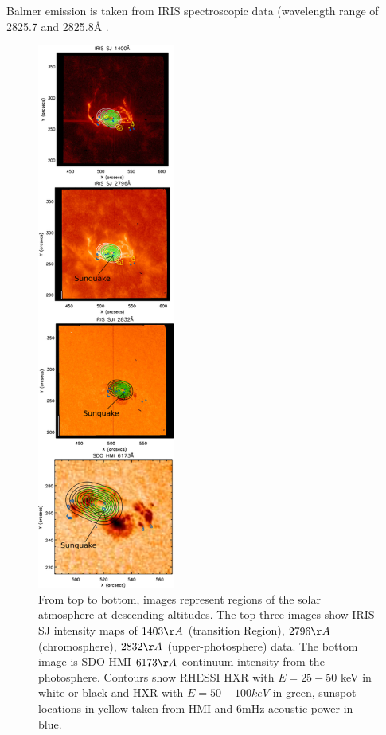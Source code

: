 Balmer emission is taken from IRIS spectroscopic data (wavelength range of 2825.7 and 2825.8Å \citep{2014ApJ...794L..23H}. \\


\begin{figure}\label{saxcontours-vert}
  \begin{center}
  \includegraphics[width=0.40\textwidth]{saxcontours-vert}
  \end{center}
  \caption{From top to bottom, images represent regions of the solar atmosphere at descending altitudes. The top three images show IRIS SJ intensity maps of $1403\AA$ (transition Region), $2796\AA$ (chromosphere), $2832\AA$ (upper-photosphere) data. The bottom image is SDO HMI $6173\AA$ continuum intensity from the photosphere. Contours show RHESSI HXR with $E = 25-50$ keV in white or black and HXR with $E = 50-100 keV$ in green, sunspot locations in yellow taken from HMI and 6mHz acoustic power in blue.}
\end{figure}





